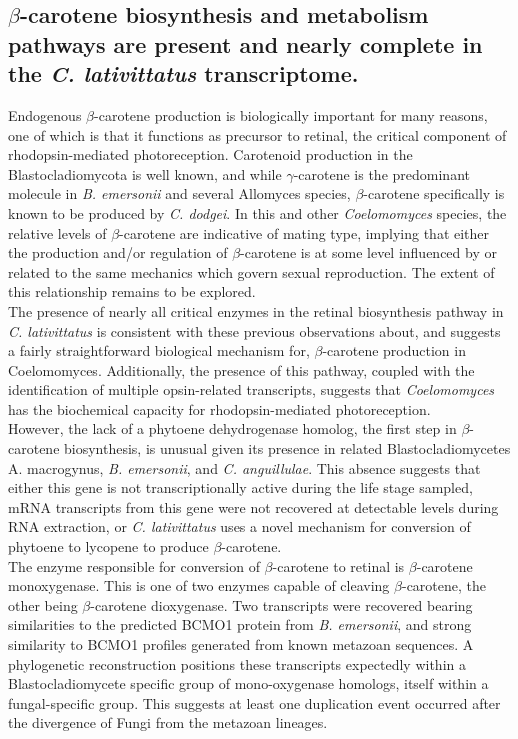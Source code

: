 \subsection*{$\beta$-carotene biosynthesis and metabolism pathways are present and nearly complete in the \textit{C. lativittatus} transcriptome.}
Endogenous $\beta$-carotene production is biologically important for many reasons, one of which is that it functions as precursor to retinal, the critical component of rhodopsin-mediated photoreception. Carotenoid production in the Blastocladiomycota is well known, and while $\gamma$-carotene is the predominant molecule in \textit{B. emersonii} and several Allomyces species, $\beta$-carotene specifically is known to be produced by \textit{C. dodgei}. In this and other \textit{Coelomomyces} species, the relative levels of $\beta$-carotene are indicative of mating type, implying that either the production and/or regulation of $\beta$-carotene is at some level influenced by or related to the same mechanics which govern sexual reproduction. The extent of this relationship remains to be explored. \\
\indent The presence of nearly all critical enzymes in the retinal biosynthesis pathway in \textit{C. lativittatus} is consistent with these previous observations about, and suggests a fairly straightforward biological mechanism for, $\beta$-carotene production in Coelomomyces. Additionally, the presence of this pathway, coupled with the identification of multiple opsin-related transcripts, suggests that \textit{Coelomomyces} has the biochemical capacity for rhodopsin-mediated photoreception. \\
\indent However, the lack of a phytoene dehydrogenase homolog, the first step in $\beta$-carotene biosynthesis, is unusual given its presence in related Blastocladiomycetes A. macrogynus, \textit{B. emersonii}, and \textit{C. anguillulae}. This absence suggests that either this gene is not transcriptionally active during the life stage sampled, mRNA transcripts from this gene were not recovered at detectable levels during RNA extraction, or \textit{C. lativittatus} uses a novel mechanism for conversion of phytoene to lycopene to produce $\beta$-carotene. \\
\indent The enzyme responsible for conversion of $\beta$-carotene to retinal is $\beta$-carotene monoxygenase. This is one of two enzymes capable of cleaving $\beta$-carotene, the other being $\beta$-carotene dioxygenase. Two transcripts were recovered bearing similarities to the predicted BCMO1 protein from \textit{B. emersonii}, and strong similarity to BCMO1 profiles generated from known metazoan sequences. A phylogenetic reconstruction positions these transcripts expectedly within a Blastocladiomycete specific group of mono-oxygenase homologs, itself within a fungal-specific group. This suggests at least one duplication event occurred after the divergence of Fungi from the metazoan lineages. \\
